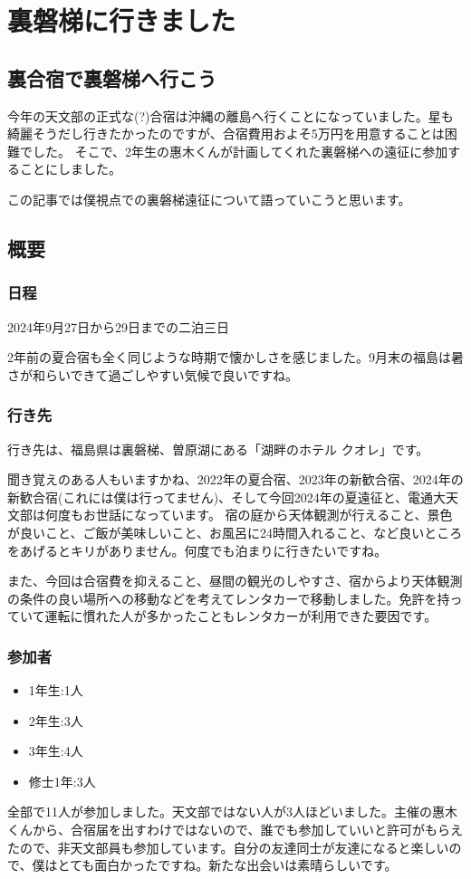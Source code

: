\documentclass[../main]{subfiles}
\begin{document}
\chapter{裏磐梯に行きました} %

\noindent

\section{裏合宿で裏磐梯へ行こう}
今年の天文部の正式な(?)合宿は沖縄の離島へ行くことになっていました。星も綺麗そうだし行きたかったのですが、合宿費用およそ5万円を用意することは困難でした。
そこで、2年生の惠木くんが計画してくれた裏磐梯への遠征に参加することにしました。

この記事では僕視点での裏磐梯遠征について語っていこうと思います。

\section{概要}
\subsection{日程}
2024年9月27日から29日までの二泊三日

2年前の夏合宿も全く同じような時期で懐かしさを感じました。9月末の福島は暑さが和らいできて過ごしやすい気候で良いですね。
\subsection{行き先}
行き先は、福島県は裏磐梯、曽原湖にある「湖畔のホテル クオレ」です。


聞き覚えのある人もいますかね、2022年の夏合宿、2023年の新歓合宿、2024年の新歓合宿(これには僕は行ってません)、そして今回2024年の夏遠征と、電通大天文部は何度もお世話になっています。
宿の庭から天体観測が行えること、景色が良いこと、ご飯が美味しいこと、お風呂に24時間入れること、など良いところをあげるとキリがありません。何度でも泊まりに行きたいですね。

また、今回は合宿費を抑えること、昼間の観光のしやすさ、宿からより天体観測の条件の良い場所への移動などを考えてレンタカーで移動しました。免許を持っていて運転に慣れた人が多かったこともレンタカーが利用できた要因です。


\subsection{参加者}
\begin{itemize}
\item 1年生:1人
\item 2年生:3人
\item 3年生:4人
\item 修士1年:3人
\end{itemize}
全部で11人が参加しました。天文部ではない人が3人ほどいました。主催の惠木くんから、合宿届を出すわけではないので、誰でも参加していいと許可がもらえたので、非天文部員も参加しています。自分の友達同士が友達になると楽しいので、僕はとても面白かったですね。新たな出会いは素晴らしいです。
\end{document}
